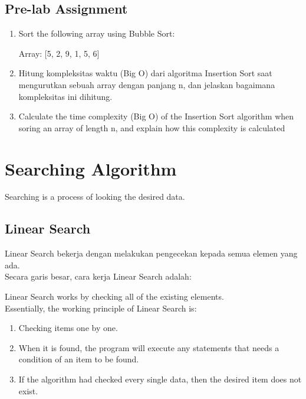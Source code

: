 \subsection{Pre-lab Assignment}
\begin{enumerate}

    \item Sort the following array using Bubble Sort:

          Array: [5, 2, 9, 1, 5, 6]
    \item Hitung kompleksitas waktu (Big O) dari algoritma Insertion Sort saat mengurutkan sebuah array dengan panjang n,
          dan jelaskan bagaimana kompleksitas ini dihitung.
    \item Calculate the time complexity (Big O) of the Insertion Sort algorithm when soring an array of length n, and
          explain how this complexity is calculated
\end{enumerate}

\section{Searching Algorithm}
Searching is a process of looking the desired data.

\subsection{Linear Search}
Linear Search bekerja dengan melakukan pengecekan kepada semua elemen yang ada.\\
Secara garis besar, cara kerja Linear Search adalah:

Linear Search works by checking all of the existing elements.\\
Essentially, the working principle of Linear Search is:

\begin{enumerate}
    \item Checking items one by one.
    \item When it is found, the program will execute any statements that needs a condition of an item to be found.
    \item If the algorithm had checked every single data, then the desired item does not exist.
\end{enumerate}


